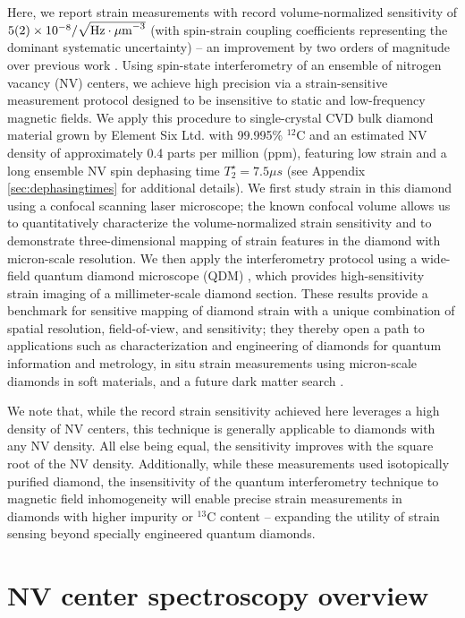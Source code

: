 \documentclass[reprint,superscriptaddress,hyphens,amsmath,amssymb,aps,prx,float]{revtex4-2}
\begin{document}
Here, we report strain measurements with record volume-normalized sensitivity of $5(2)\times10^{-8}/\sqrt{{\rm Hz \cdot \mu m}^{-3}}$ (with spin-strain coupling coefficients representing the dominant systematic uncertainty) -- an improvement by two orders of magnitude over previous work \cite{StrainPaper}.  Using spin-state interferometry of an ensemble of nitrogen vacancy (NV) centers, we achieve high precision via a strain-sensitive measurement protocol designed to be insensitive to static and low-frequency magnetic fields.  We apply this procedure to single-crystal CVD bulk diamond material grown by Element Six Ltd. with 99.995\% $^{12}$C and an estimated NV density of approximately 0.4 parts per million (ppm), featuring low strain and a long ensemble NV spin dephasing time $T_2^\star=7.5 \mu s$ (see Appendix \ref{sec:dephasingtimes} for additional details).  We first study strain in this diamond using a confocal scanning laser microscope; the known confocal volume allows us to quantitatively characterize the volume-normalized strain sensitivity and to demonstrate three-dimensional mapping of strain features in the diamond with micron-scale resolution.  We then apply the interferometry protocol using a wide-field quantum diamond microscope (QDM) \cite{GlennGGG,GlennMTB2015,QDMreview}, which provides high-sensitivity strain imaging of a millimeter-scale diamond section.  These results provide a benchmark for sensitive mapping of diamond strain with a unique combination of spatial resolution, field-of-view, and sensitivity; they thereby open a path to applications such as characterization and engineering of diamonds for quantum information and metrology, in situ strain measurements using micron-scale diamonds in soft materials, and a future dark matter search \cite{proposal,MarshallQST2021}.

We note that, while the record strain sensitivity achieved here leverages a high density of NV centers, this technique is generally applicable to diamonds with any NV density.  All else being equal, the sensitivity improves with the square root of the NV density.  Additionally, while these measurements used isotopically purified diamond, the insensitivity of the quantum interferometry technique to magnetic field inhomogeneity will enable precise strain measurements in diamonds with higher impurity or $^{13}$C content -- expanding the utility of strain sensing beyond specially engineered quantum diamonds.

\introfigure

\section{NV center spectroscopy overview}
\end{document}
